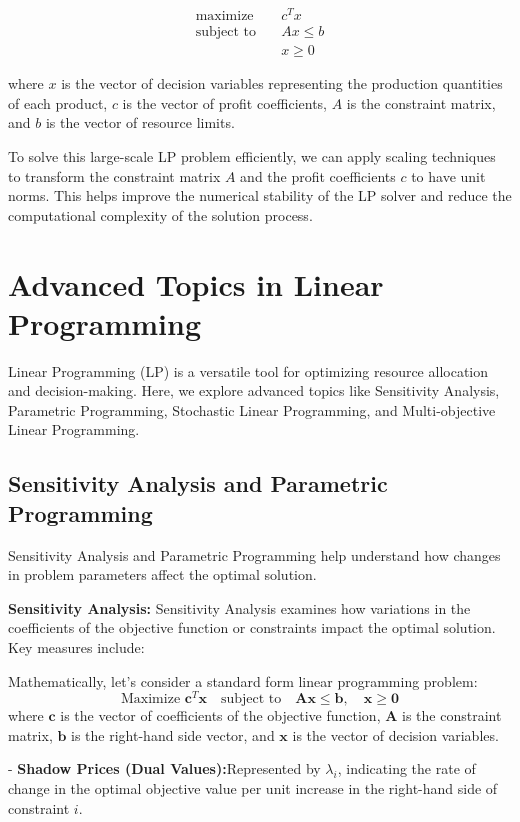 \documentclass[12pt]{book} %
\begin{document}
\begin{align*}
\text{maximize} \quad & c^Tx \\
\text{subject to} \quad & Ax \leq b \\
& x \geq 0
\end{align*}

where \(x\) is the vector of decision variables representing the production quantities of each product, \(c\) is the vector of profit coefficients, \(A\) is the constraint matrix, and \(b\) is the vector of resource limits.

To solve this large-scale LP problem efficiently, we can apply scaling techniques to transform the constraint matrix \(A\) and the profit coefficients \(c\) to have unit norms. This helps improve the numerical stability of the LP solver and reduce the computational complexity of the solution process.


\section{Advanced Topics in Linear Programming}

Linear Programming (LP) is a versatile tool for optimizing resource allocation and decision-making. Here, we explore advanced topics like Sensitivity Analysis, Parametric Programming, Stochastic Linear Programming, and Multi-objective Linear Programming.

\subsection{Sensitivity Analysis and Parametric Programming}

Sensitivity Analysis and Parametric Programming help understand how changes in problem parameters affect the optimal solution.

\textbf{Sensitivity Analysis:}
Sensitivity Analysis examines how variations in the coefficients of the objective function or constraints impact the optimal solution. Key measures include:

Mathematically, let's consider a standard form linear programming problem:
\[
\text{Maximize } \mathbf{c}^T \mathbf{x} \quad \text{subject to} \quad \mathbf{Ax} \leq \mathbf{b}, \quad \mathbf{x} \geq \mathbf{0}
\]
where $\mathbf{c}$ is the vector of coefficients of the objective function, $\mathbf{A}$ is the constraint matrix, $\mathbf{b}$ is the right-hand side vector, and $\mathbf{x}$ is the vector of decision variables.

- \textbf{Shadow Prices (Dual Values):}Represented by \(\lambda_i\), indicating the rate of change in the optimal objective value per unit increase in the right-hand side of constraint \(i\).
\end{document}
